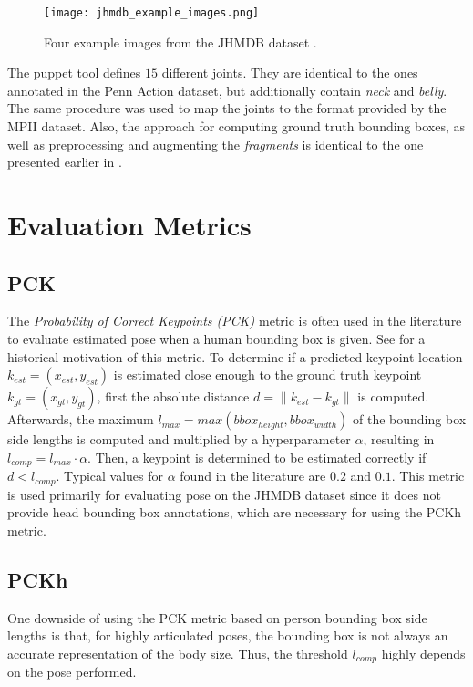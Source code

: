 \begin{figure}[htb!]
    \centering
    \texttt{[image: jhmdb\_example\_images.png]}
    \caption{Four example images from the JHMDB dataset \cite{jhuang_towards_2013}. }
    \label{fig:jhmdb_example_images}
\end{figure}

The puppet tool defines $15$ different joints.
They are identical to the ones annotated in the Penn Action dataset, but additionally contain \textit{neck} and \textit{belly}.
The same procedure was used to map the joints to the format provided by the MPII dataset.
Also, the approach for computing ground truth bounding boxes, as well as preprocessing and augmenting the \textit{fragments} is identical to the one presented earlier in .

\section{Evaluation Metrics}
\label{sec:exp-metrics}
\subsection{PCK}
\label{sec:exp-pck}

The \textit{Probability of Correct Keypoints (PCK)} metric \cite{ferrari_progressive_2008} is often used in the literature to evaluate estimated pose when a human bounding box is given.
See  for a historical motivation of this metric.
To determine if a predicted keypoint location $k_{est} = (x_{est}, y_{est})$ is estimated close enough to the ground truth keypoint $k_{gt} = (x_{gt}, y_{gt})$, first the absolute distance $d = \lVert k_{est} - k_{gt} \rVert$ is computed.
Afterwards, the maximum $l_{max} = max(bbox_{height}, bbox_{width})$ of the bounding box side lengths is computed and multiplied by a hyperparameter $\alpha$, resulting in $l_{comp} = l_{max} \cdot \alpha$.
Then, a keypoint is determined to be estimated correctly if $d < l_{comp}$.
Typical values for $\alpha$ found in the literature are $0.2$ and $0.1$.
This metric is used primarily for evaluating pose on the JHMDB dataset since it does not provide head bounding box annotations, which are necessary for using the PCKh metric.

\subsection{PCKh}
\label{sec:exp-pckh}
One downside of using the PCK metric based on person bounding box side lengths is that, for highly articulated poses, the bounding box is not always an accurate representation of the body size.
Thus, the threshold $l_{comp}$ highly depends on the pose performed.

